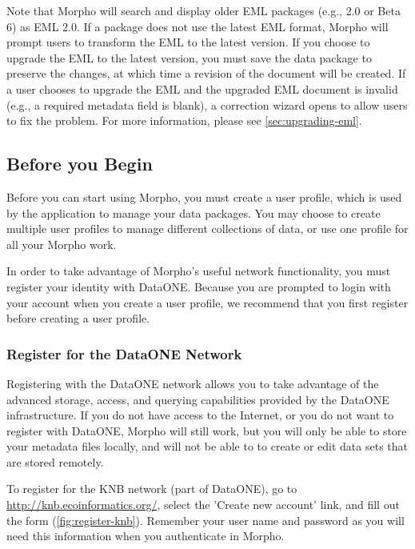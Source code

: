 Note that Morpho will search and display older EML packages (e.g., 2.0
or Beta 6) as EML 2.0. If a package does not use the latest EML format,
Morpho will prompt users to transform the EML to the latest version. If
you choose to upgrade the EML to the latest version, you must save the
data package to preserve the changes, at which time a revision of the 
document will be created. If a user chooses to upgrade the
EML and the upgraded EML document is invalid (e.g., a required metadata
field is blank), a correction wizard opens to allow users to fix the
problem. For more information, please see \autoref{sec:upgrading-eml}.

\subsection{Before you Begin} \label{sec:before-you-begin}

Before you can start using Morpho, you must create a user profile, which
is used by the application to manage your data packages. You may choose
to create multiple user profiles to manage different collections of
data, or use one profile for all your Morpho work. 

In order to take advantage of Morpho's useful network functionality, you
must register your identity with DataONE.  Because you are prompted to
login with your account when you create a user profile,
we recommend that you first register before creating a user profile.

\subsubsection{Register for the DataONE Network} \label{sec:register}

Registering with the DataONE network allows you to take advantage of the
advanced storage, access, and querying capabilities provided by the
DataONE infrastructure. If you do not have access to the Internet, or you do not
want to register with DataONE, Morpho will still work, but you will only
be able to store your metadata files locally, and will not be able to
to create or edit data sets that are stored remotely.

To register for the KNB network (part of DataONE), go to
\url{http://knb.ecoinformatics.org/}, select the 'Create new account'
link, and fill out the form (\autoref{fig:register-knb}). Remember 
your user name and password as you will need this information when you
authenticate in Morpho.

